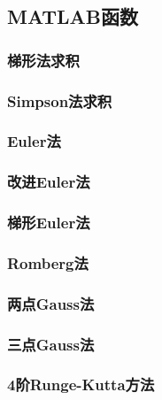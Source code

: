 \subsection{MATLAB函数}

\subsubsection{梯形法求积}


\subsubsection{Simpson法求积}


\subsubsection{Euler法}


\subsubsection{改进Euler法}


\subsubsection{梯形Euler法}


\subsubsection{Romberg法}


\subsubsection{两点Gauss法}


\subsubsection{三点Gauss法}


\subsubsection{4阶Runge-Kutta方法}
